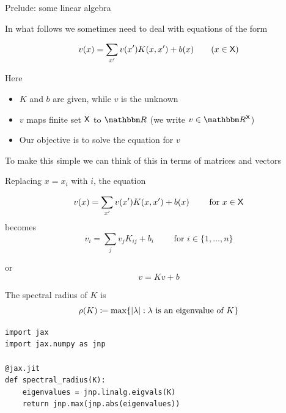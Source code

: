 \documentclass[dvipsnames]{beamer}
\begin{document}
\begin{frame}{Prelude: some linear algebra}

    In what follows we sometimes need to deal with equations of the form

    \begin{equation*}
        v(x) = \sum_{x'} v(x') K(x, x') + b(x)
        \qquad (x \in \mathsf X)
    \end{equation*}

            \medskip
    Here 

    \begin{itemize}
        \item $K$ and $b$ are given, while $v$ is the unknown
            \medskip
        \item $v$ maps finite set $\mathsf X$ to $\RR$  (we write $v \in \RR^\Xsf$)
            \medskip
        \item Our objective is to solve the equation for $v$
    \end{itemize}

\end{frame}

\begin{frame}
    
    To make this simple we can think of this in terms of matrices and vectors

    Replacing $x = x_i$ with $i$, the equation

    \begin{equation*}
        v(x) = \sum_{x'} v(x') K(x, x') + b(x)
        \qquad \text{ for } x \in \mathsf X
    \end{equation*}
    becomes
    \begin{equation*}
        v_i = \sum_{j} v_j K_{ij} + b_i
        \qquad \text{ for } i \in \{1, \ldots, n\}
    \end{equation*}

    or
    \begin{equation*}
        v = K v + b
    \end{equation*}

\end{frame}

\begin{frame}[fragile]
    
    The spectral radius of $K$ is
    \begin{equation*}
        \rho(K) \coloneq \max \{ |\lambda| : \lambda \text{ is an eigenvalue of } K \}
    \end{equation*}

    \medskip
    \medskip
    \medskip

    \begin{verbatim}
import jax
import jax.numpy as jnp

@jax.jit
def spectral_radius(K):
    eigenvalues = jnp.linalg.eigvals(K)
    return jnp.max(jnp.abs(eigenvalues))
    \end{verbatim}

\end{frame}
\end{document}
